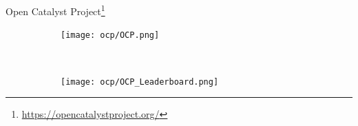 \begin{frame}{Open Catalyst Project\footnote{\url{https://opencatalystproject.org/}}}
    \begin{figure}
        \begin{subfigure}[t]{0.49\textwidth}
            \texttt{[image: ocp/OCP.png]}
        \end{subfigure}%
        ~
        \begin{subfigure}[t]{0.49\textwidth}
            \texttt{[image: ocp/OCP\_Leaderboard.png]}
        \end{subfigure}
    \end{figure}
    \vspace*{1em}
\end{frame}